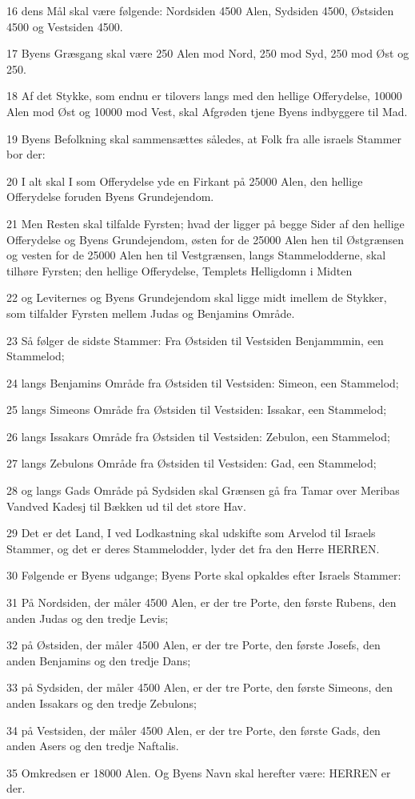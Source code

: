 \par 16 dens Mål skal være følgende: Nordsiden 4500 Alen, Sydsiden 4500, Østsiden 4500 og Vestsiden 4500.
\par 17 Byens Græsgang skal være 250 Alen mod Nord, 250 mod Syd, 250 mod Øst og 250.
\par 18 Af det Stykke, som endnu er tilovers langs med den hellige Offerydelse, 10000 Alen mod Øst og 10000 mod Vest, skal Afgrøden tjene Byens indbyggere til Mad.
\par 19 Byens Befolkning skal sammensættes således, at Folk fra alle israels Stammer bor der:
\par 20 I alt skal I som Offerydelse yde en Firkant på 25000 Alen, den hellige Offerydelse foruden Byens Grundejendom.
\par 21 Men Resten skal tilfalde Fyrsten; hvad der ligger på begge Sider af den hellige Offerydelse og Byens Grundejendom, østen for de 25000 Alen hen til Østgrænsen og vesten for de 25000 Alen hen til Vestgrænsen, langs Stammelodderne, skal tilhøre Fyrsten; den hellige Offerydelse, Templets Helligdomn i Midten
\par 22 og Leviternes og Byens Grundejendom skal ligge midt imellem de Stykker, som tilfalder Fyrsten mellem Judas og Benjamins Område.
\par 23 Så følger de sidste Stammer: Fra Østsiden til Vestsiden Benjammmin, een Stammelod;
\par 24 langs Benjamins Område fra Østsiden til Vestsiden: Simeon, een Stammelod;
\par 25 langs Simeons Område fra Østsiden til Vestsiden: Issakar, een Stammelod;
\par 26 langs Issakars Område fra Østsiden til Vestsiden: Zebulon, een Stammelod;
\par 27 langs Zebulons Område fra Østsiden til Vestsiden: Gad, een Stammelod;
\par 28 og langs Gads Område på Sydsiden skal Grænsen gå fra Tamar over Meribas Vandved Kadesj til Bækken ud til det store Hav.
\par 29 Det er det Land, I ved Lodkastning skal udskifte som Arvelod til Israels Stammer, og det er deres Stammelodder, lyder det fra den Herre HERREN.
\par 30 Følgende er Byens udgange; Byens Porte skal opkaldes efter Israels Stammer:
\par 31 På Nordsiden, der måler 4500 Alen, er der tre Porte, den første Rubens, den anden Judas og den tredje Levis;
\par 32 på Østsiden, der måler 4500 Alen, er der tre Porte, den første Josefs, den anden Benjamins og den tredje Dans;
\par 33 på Sydsiden, der måler 4500 Alen, er der tre Porte, den første Simeons, den anden Issakars og den tredje Zebulons;
\par 34 på Vestsiden, der måler 4500 Alen, er der tre Porte, den første Gads, den anden Asers og den tredje Naftalis.
\par 35 Omkredsen er 18000 Alen. Og Byens Navn skal herefter være: HERREN er der.


